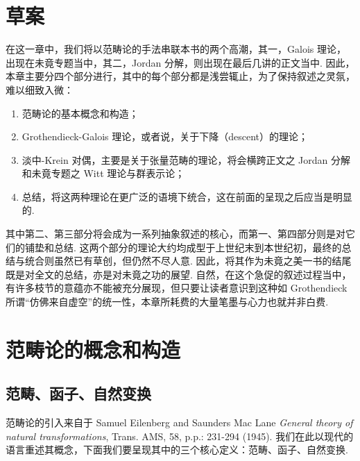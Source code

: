 \section{草案}

在这一章中，我们将以范畴论的手法串联本书的两个高潮，其一，Galois 理论，出现在未竟专题当中，其二，Jordan 分解，则出现在最后几讲的正文当中. 因此，本章主要分四个部分进行，其中的每个部分都是浅尝辄止，为了保持叙述之灵氛，难以细致入微：

\begin{enumerate}
    \item 范畴论的基本概念和构造；
    \item Grothendieck-Galois 理论，或者说，关于下降（descent）的理论；
    \item 淡中-Krein 对偶，主要是关于张量范畴的理论，将会横跨正文之 Jordan 分解和未竟专题之 Witt 理论与群表示论；
    \item 总结，将这两种理论在更广泛的语境下统合，这在前面的呈现之后应当是明显的.
\end{enumerate}

其中第二、第三部分将会成为一系列抽象叙述的核心，而第一、第四部分则是对它们的铺垫和总结. 这两个部分的理论大约均成型于上世纪末到本世纪初，最终的总结与统合则虽然已有草创，但仍然不尽人意. 因此，将其作为未竟之美一书的结尾既是对全文的总结，亦是对未竟之功的展望. 自然，在这个急促的叙述过程当中，有许多枝节的意蕴亦不能被充分展现，但只要让读者意识到这种如 Grothendieck 所谓``仿佛来自虚空''的统一性，本章所耗费的大量笔墨与心力也就并非白费.

\section{范畴论的概念和构造}

\subsection{范畴、函子、自然变换}

范畴论的引入来自于 Samuel Eilenberg and Saunders Mac Lane \emph{General theory of natural transformations}, Trans. AMS, 58, p.p.: 231-294 (1945). 我们在此以现代的语言重述其概念，下面我们要呈现其中的三个核心定义：范畴、函子、自然变换.

